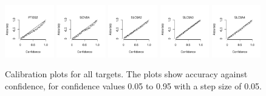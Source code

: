 \documentclass[utf8]{frontiers_suppmat} %
\begin{document}
\begin{figure}[h!]
    \includegraphics[width=0.19\textwidth]{figures/calibration_plots/ptgs2_calib.pdf}
    \includegraphics[width=0.19\textwidth]{figures/calibration_plots/scn5a_calib.pdf}
    \includegraphics[width=0.19\textwidth]{figures/calibration_plots/slc6a2_calib.pdf}
    \includegraphics[width=0.19\textwidth]{figures/calibration_plots/slc6a3_calib.pdf}
    \vspace*{-15pt} %
    \includegraphics[width=0.19\textwidth]{figures/calibration_plots/slc6a4_calib.pdf}
        \caption{Calibration plots for all targets. The plots show accuracy against
            confidence, for confidence values 0.05 to 0.95 with a step size of 0.05.}
        \label{fig:calplots_all}
\end{figure}

\clearpage
\end{document}

